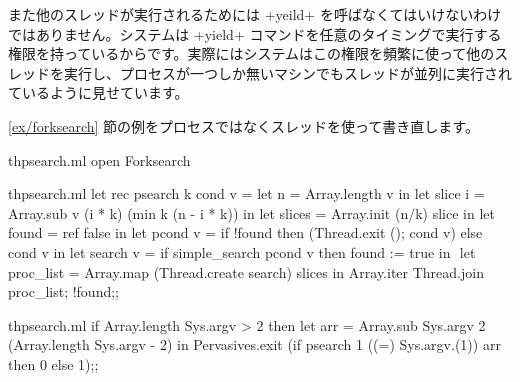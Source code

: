 また他のスレッドが実行されるためには \ml+yeild+ を呼ばなくてはいけないわけではありません。システムは \ml+yield+ コマンドを任意のタイミングで実行する権限を持っているからです。実際にはシステムはこの権限を頻繁に使って他のスレッドを実行し、プロセスが一つしか無いマシンでもスレッドが並列に実行されているように見せています。

\begin{example}
\ref{ex/forksearch} 節の例をプロセスではなくスレッドを使って書き直します。
\begin{codefile}{thpsearch.ml}
open Forksearch
\end{codefile}
%
\begin{listingcodefile}[style=numbers]{thpsearch.ml}
let rec psearch k cond v =
  let n = Array.length v in
  let slice i = Array.sub v (i * k) (min k (n - i * k)) in
  let slices = Array.init (n/k) slice in
  let found = ref false in
  let pcond v = if !found then (Thread.exit (); cond v) else cond v in
  let search v = if simple_search pcond v then found := true in $\label{prog:search}$
  let proc_list = Array.map (Thread.create search) slices in
  Array.iter Thread.join proc_list;
  !found;;
\end{listingcodefile}
%
\begin{codefile}{thpsearch.ml}
if Array.length Sys.argv > 2 then
let arr = Array.sub Sys.argv 2 (Array.length Sys.argv - 2) in
Pervasives.exit (if psearch 1 ((=) Sys.argv.(1)) arr then  0 else 1);;
\end{codefile}
%

\end{example}
